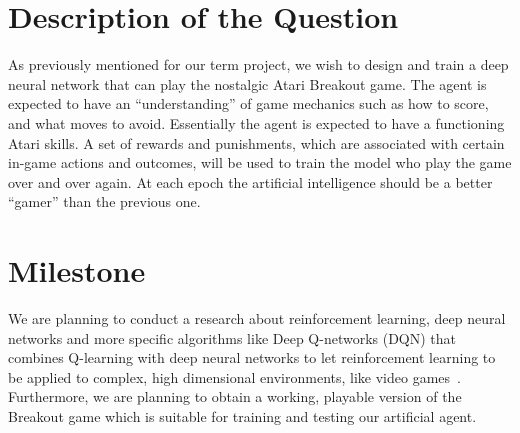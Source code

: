 \documentclass[a4paper, 12pt, conference]{IEEEtran}
\begin{document}
\section{Description of the Question}
As previously mentioned for our term project, we wish to design and train a deep neural network that can play the nostalgic Atari\texttrademark{} Breakout game. The agent is expected to have an ``understanding'' of game mechanics such as how to score, and what moves to avoid. Essentially the agent is expected to have a functioning Atari\texttrademark{} skills.
A set of rewards and punishments, which are associated with certain in-game actions and outcomes, will be used to train the model who play the game over and over again.
At each epoch the artificial intelligence should be a better ``gamer'' than the previous one.

\section{Milestone}
We are planning to conduct a research about reinforcement learning, deep neural networks and more specific algorithms like Deep Q-networks (DQN) that combines Q-learning with deep neural networks to let reinforcement learning to be applied to complex, high dimensional environments, like video games~\autocite{openai}. Furthermore, we are planning to obtain a working, playable version of the Breakout game which is suitable for training and testing our artificial agent.

\printbibliography{}
\end{document}

